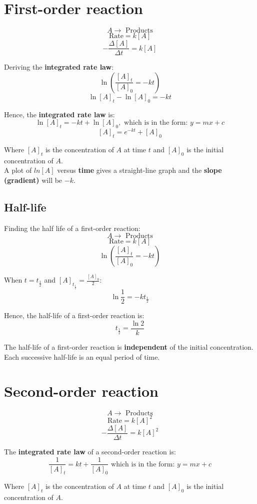\documentclass[11pt]{article}
\begin{document}
\newpage

\section{First-order reaction}
\label{sec:org646d0e9}
\[A \rightarrow \text{ Products}\]
\[\text{Rate} = k[A]\]
\[- \frac{\Delta [A]}{\Delta t} = k[A]\]

Deriving the \textbf{integrated rate law}:
\[\ln \left( \frac{[A]_t}{[A]_0} = -kt \right)\]
\[\ln [A]_t - \ln [A]_0 = -kt\]

Hence, the \textbf{integrated rate law} is:
\[\ln [A]_t = -kt + \ln [A]_0, \text{ which is in the form: } y = mx + c\]
\[[A]_t = e^{-kt} + [A]_0\]

Where \([A]_t\) is the concentration of \(A\) at time \(t\) and \([A]_0\) is the initial concentration of \(A\).
\\[0pt]

A plot of \(ln[A]\) versus \textbf{time} gives a straight-line graph and the \textbf{slope (gradient)} will be \(-k\).

\subsection{Half-life}
\label{sec:orgc57715b}

Finding the half life of a first-order reaction:
\[A \rightarrow \text{ Products}\]
\[\text{Rate} = k[A]\]
\[\ln \left( \frac{[A]_t}{[A]_0} = -kt \right)\]

When \(t = t_{\frac{1}{2}}\) and \([A]_{t_{\frac{1}{2}}} = \frac{[A]_0}{2}\):
\[\ln \frac{1}{2} = -kt_{\frac{1}{2}}\]

Hence, the half-life of a first-order reaction is:
\[t_{\frac{1}{2}} = \frac{\ln 2}{k}\]

The half-life of a first-order reaction is \textbf{independent} of the initial concentration. Each successive half-life is an equal period of time.


\section{Second-order reaction}
\label{sec:org7a489fd}
\[A \rightarrow \text{ Products}\]
\[\text{Rate} = k[A]^2\]
\[- \frac{\Delta [A]}{\Delta t} = k[A]^2\]

The \textbf{integrated rate law} of a second-order reaction is:
\[\frac{1}{[A]_t} = kt + \frac{1}{[A]_0} \text{ which is in the form: } y = mx + c\]

Where \([A]_t\) is the concentration of \(A\) at time \(t\) and \([A]_0\) is the initial concentration of \(A\).
\\[0pt]
\end{document}
